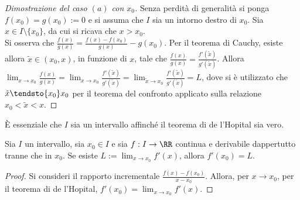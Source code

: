 \documentclass[11pt]{article}
\begin{document}
	\begin{proof}[Dimostrazione del caso $(a)$ con $x_0$]
		Senza perdità di generalità si ponga $f(x_0) = g(x_0) := 0$ e si
		assuma che $I$ sia un intorno destro di $x_0$. Sia $x \in I \setminus \{x_0\}$, da cui si ricava che $x > x_0$. \\
		
		Si osserva che $\frac{f(x)}{g(x)} = \frac{f(x) - f(x_0)}{g(x)} - g(x_0)$. Per il teorema di Cauchy, esiste allora $\tilde{x} \in (x_0, x)$,
		in funzione di $x$, tale
		che $\frac{f(x)}{g(x)} = \frac{f'(\tilde x)}{g'(\tilde x)}$. Allora
		$\lim_{x \to x_0} \frac{f(x)}{g(x)} = \lim_{x \to x_0} \frac{f'(\tilde x)}{g'(\tilde x)} = \lim_{\tilde x \to x_0} \frac{f'(\tilde x)}{g'(\tilde x)} = L$, dove si è utilizzato che $\tilde x \tendsto{x_0} x_0$ per il teorema del confronto applicato sulla
		relazione $x_0 < \tilde x < x$.
	\end{proof}

	\begin{remark}
		È essenziale che $I$ sia un intervallo affinché il teorema di de
		l'Hopital sia vero.
	\end{remark}

	\begin{proposition}
		Sia $I$ un intervallo, sia $x_0 \in I$ e sia $f : I \to \RR$ continua
		e derivabile dappertutto tranne che in $x_0$. Se esiste
		$L := \lim_{x \to x_0} f'(x)$, allora $f'(x_0) = L$.
	\end{proposition}

	\begin{proof}
		Si consideri il rapporto incrementale $\frac{f(x) - f(x_0)}{x - x_0}$.
		Allora, per $x \to x_0$, per il teorema di de l'Hopital, $f'(x_0) = \lim_{x \to x_0} f'(x)$.
	\end{proof}
\end{document}
